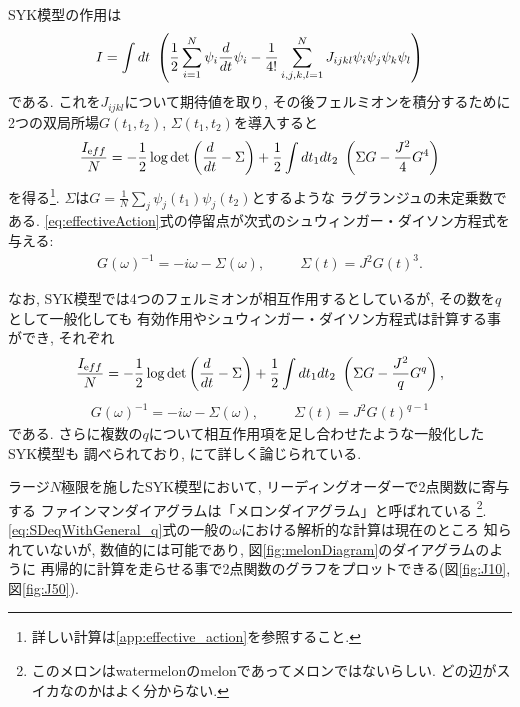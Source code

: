 SYK模型の作用は
\begin{align}
  I = \int dt\ \left(\frac{1}{2}\sum_{i = 1}^{N} \psi_i \frac{d}{dt} \psi_i
		- \frac{1}{4!} \sum_{i,j,k,l = 1}^{N} J_{ijkl} \psi_i\psi_j\psi_k\psi_l
    \right)
\end{align}
である. 
これを$J_{ijkl}$について期待値を取り, その後フェルミオンを積分するために
2つの双局所場$G(t_1, t_2)$, $\Sigma(t_1, t_2)$を導入すると
\begin{align}
  \frac{I_{\mathrm eff}}{N} =
		- \frac{1}{2}\log\det\left(\frac{d}{dt} - \Sigma\right)
		+ \frac{1}{2}\int dt_1dt_2\ \left(\Sigma G - \frac{J^2}{4}G^4\right)
  \label{eq:effectiveAction}
\end{align}
を得る\footnote{詳しい計算は\ref{app:effective_action}を参照すること.}. 
$\Sigma$は$G = \frac{1}{N}\sum_j \psi_j(t_1)\psi_j(t_2)$とするような
ラグランジュの未定乗数である. 
\eqref{eq:effectiveAction}式の停留点が次式のシュウィンガー・ダイソン方程式を与える:
\begin{align}
  G(\omega)^{-1} = -i\omega - \Sigma(\omega),
  \hspace{30pt}
  \Sigma(t) = J^2G(t)^3.
  \label{eq:SDeq}
\end{align}

なお, SYK模型では4つのフェルミオンが相互作用するとしているが, その数を$q$として一般化しても
有効作用やシュウィンガー・ダイソン方程式は計算する事ができ, それぞれ
\begin{align}
  \frac{I_{\mathrm eff}}{N} =
		- \frac{1}{2}\log\det\left(\frac{d}{dt} - \Sigma\right)
		+ \frac{1}{2}\int dt_1dt_2\ \left(\Sigma G - \frac{J^2}{q}G^q\right),
  \label{eq:effectiveActionWithGeneral_q}
\end{align}
\begin{align}
  G(\omega)^{-1} = -i\omega - \Sigma(\omega),
  \hspace{30pt}
  \Sigma(t) = J^2G(t)^{q-1}
  \label{eq:SDeqWithGeneral_q}
\end{align}
である. さらに複数の$q$について相互作用項を足し合わせたような一般化したSYK模型も
調べられており, \cite{gross}にて詳しく論じられている. 

ラージ$N$極限を施したSYK模型において, リーディングオーダーで2点関数に寄与する
ファインマンダイアグラムは「メロンダイアグラム」と呼ばれている
\footnote{このメロンはwatermelonのmelonであってメロンではないらしい.
どの辺がスイカなのかはよく分からない.}. 
\eqref{eq:SDeqWithGeneral_q}式の一般の$\omega$における解析的な計算は現在のところ
知られていないが, 数値的には可能であり, 図\ref{fig:melonDiagram}のダイアグラムのように
再帰的に計算を走らせる事で2点関数のグラフをプロットできる(図\ref{fig:J10}, 図\ref{fig:J50}). 

